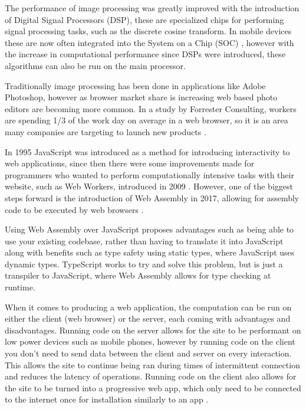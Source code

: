 \documentclass[12pt,a4paper]{article}
\begin{document}
The performance of image processing was greatly improved with the introduction of Digital Signal Processors (DSP), these are specialized chips for performing signal processing tasks, such as the discrete cosine transform. In mobile devices these are now often integrated into the System on a Chip (SOC) \cite{angoletta2008digital}, however with the increase in computational performance since DSPs were introduced, these algorithms can also be run on the main processor.

Traditionally image processing has been done in applications like Adobe Photoshop, however as browser market share is increasing web based photo editors are becoming more common. In a study by Forrester Consulting, workers are spending 1/3 of the work day on average in a web browser, so it is an area many companies are targeting to launch new products \cite{cloud_worker}.


In 1995 JavaScript was introduced as a method for introducing interactivity to web applications, since then there were some improvements made for programmers who wanted to perform computationally intensive tasks with their website, such as Web Workers, introduced in 2009 \cite{Hickson}. However, one of the biggest steps forward is the introduction of Web Assembly in 2017, allowing for assembly code to be executed by web browsers \cite{haas2017bringing}.

Using Web Assembly over JavaScript proposes advantages such as being able to use your existing codebase, rather than having to translate it into JavaScript along with benefits such as type safety using static types, where JavaScript uses dynamic types. TypeScript works to try and solve this problem, but is just a transpiler to JavaScript, where Web Assembly allows for type checking at runtime.

\color{Mulberry}
When it comes to producing a web application, the computation can be run on either the client (web browser) or the server, each coming with advantages and disadvantages. Running code on the server allows for the site to be performant on low power devices such as mobile phones, however by running code on the client you don't need to send data between the client and server on every interaction. This allows the site to continue being ran during times of intermittent connection and reduces the latency of operations. Running code on the client also allows for the site to be turned into a progressive web app, which only need to be connected to the internet once for installation similarly to an app \cite{biorn2017progressive}.
\color{black}
\end{document}
